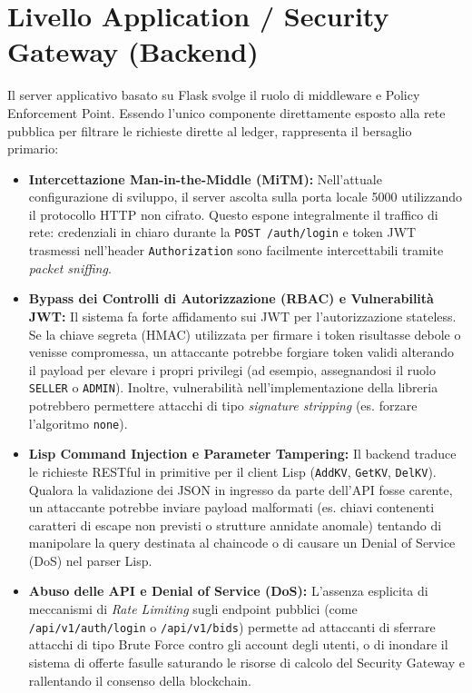 \section{Livello Application / Security Gateway (Backend)}
Il server applicativo basato su Flask svolge il ruolo di middleware e Policy Enforcement Point. Essendo l'unico componente direttamente esposto alla rete pubblica per filtrare le richieste dirette al ledger, rappresenta il bersaglio primario:

\begin{itemize}
    \item \textbf{Intercettazione Man-in-the-Middle (MiTM):} Nell'attuale configurazione di sviluppo, il server ascolta sulla porta locale 5000 utilizzando il protocollo HTTP non cifrato. Questo espone integralmente il traffico di rete: credenziali in chiaro durante la \texttt{POST /auth/login} e token JWT trasmessi nell'header \texttt{Authorization} sono facilmente intercettabili tramite \textit{packet sniffing}.
    \item \textbf{Bypass dei Controlli di Autorizzazione (RBAC) e Vulnerabilità JWT:} Il sistema fa forte affidamento sui JWT per l'autorizzazione stateless. Se la chiave segreta (HMAC) utilizzata per firmare i token risultasse debole o venisse compromessa, un attaccante potrebbe forgiare token validi alterando il payload per elevare i propri privilegi (ad esempio, assegnandosi il ruolo \texttt{SELLER} o \texttt{ADMIN}). Inoltre, vulnerabilità nell'implementazione della libreria potrebbero permettere attacchi di tipo \textit{signature stripping} (es. forzare l'algoritmo \texttt{none}).
    \item \textbf{Lisp Command Injection e Parameter Tampering:} Il backend traduce le richieste RESTful in primitive per il client Lisp (\texttt{AddKV}, \texttt{GetKV}, \texttt{DelKV}). Qualora la validazione dei JSON in ingresso da parte dell'API fosse carente, un attaccante potrebbe inviare payload malformati (es. chiavi contenenti caratteri di escape non previsti o strutture annidate anomale) tentando di manipolare la query destinata al chaincode o di causare un Denial of Service (DoS) nel parser Lisp.
    \item \textbf{Abuso delle API e Denial of Service (DoS):} L'assenza esplicita di meccanismi di \textit{Rate Limiting} sugli endpoint pubblici (come \texttt{/api/v1/auth/login} o \texttt{/api/v1/bids}) permette ad attaccanti di sferrare attacchi di tipo Brute Force contro gli account degli utenti, o di inondare il sistema di offerte fasulle saturando le risorse di calcolo del Security Gateway e rallentando il consenso della blockchain.
\end{itemize}

